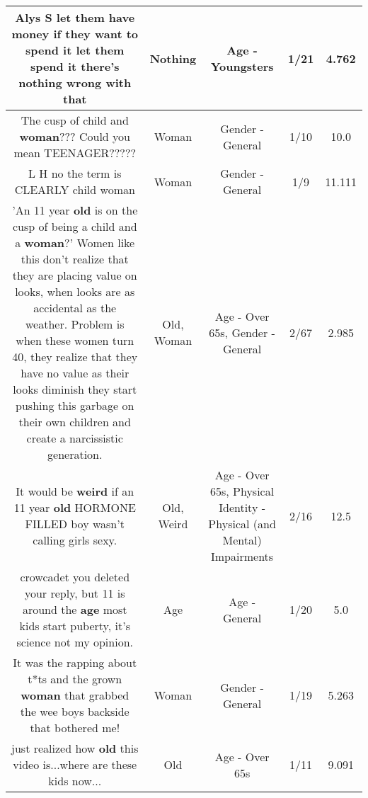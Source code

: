 \documentclass[11pt]{article}
\newlength\mylength
\begin{document}
\begin{center}
\begin{longtable}{|C{.65\mylength}|C{.30\mylength}|C{.12\mylength}|C{.12\mylength}|C{.12\mylength}|}
  \small Alys S let them have money if they want to spend it let them spend it there's \textbf{nothing} wrong with that\normalsize   & Nothing & Age - Youngsters & 1/21 & 4.762 \\  \hline
  \small The cusp of child and \textbf{woman}??? Could you mean TEENAGER?????\normalsize   & Woman & Gender - General & 1/10 & 10.0 \\  \hline
  \small L H no the term is CLEARLY child woman\normalsize   & Woman & Gender - General & 1/9 & 11.111 \\  \hline
  \small 'An 11 year \textbf{old} is on the cusp of being a child and a \textbf{woman}?' Women like this don't realize that they are placing value on looks, when looks are as accidental as the weather. Problem is when these women turn 40, they realize that they have no value as their looks diminish they start pushing this garbage on their own children and create a narcissistic generation.\normalsize   & Old, Woman & Age - Over 65s, Gender - General & 2/67 & 2.985 \\  \hline
  \small It would be \textbf{weird} if an 11 year \textbf{old} HORMONE FILLED boy wasn't calling girls sexy.\normalsize   & Old, Weird & Age - Over 65s, Physical Identity - Physical (and Mental) Impairments & 2/16 & 12.5 \\  \hline
  \small crowcadet you deleted your reply, but 11 is around the \textbf{age} most kids start puberty, it's science not my opinion.\normalsize   & Age & Age - General & 1/20 & 5.0 \\  \hline
  \small It was the rapping about t*ts and the grown \textbf{woman} that grabbed the wee boys backside that bothered me!\normalsize   & Woman & Gender - General & 1/19 & 5.263 \\  \hline
  \small just realized how \textbf{old} this video is...where are these kids now...\normalsize   & Old & Age - Over 65s & 1/11 & 9.091 \\  \hline

\end{longtable}
\end{center}
\end{document}
